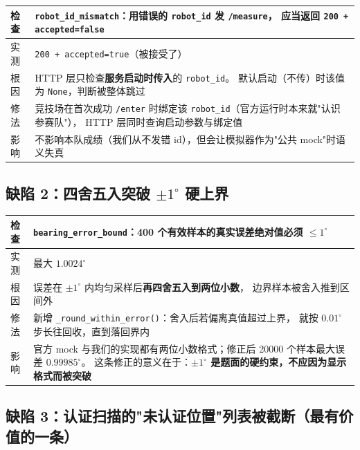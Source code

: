 \begin{center}
\begin{tabular}{p{3.2cm}p{11.6cm}}
\toprule
检查 & \texttt{robot\_id\_mismatch}：用错误的 \texttt{robot\_id} 发 \texttt{/measure}，
应当返回 \texttt{200 + accepted=false} \\ \midrule
实测 & \texttt{200 + accepted=true}（被接受了） \\
根因 & HTTP 层只检查\textbf{服务启动时传入}的 \texttt{robot\_id}。
默认启动（不传）时该值为 \texttt{None}，判断被整体跳过 \\
修法 & 竞技场在首次成功 \texttt{/enter} 时绑定该 \texttt{robot\_id}（官方运行时本来就"认识参赛队"），
HTTP 层同时查询启动参数与绑定值 \\
影响 & 不影响本队成绩（我们从不发错 id），但会让模拟器作为"公共 mock"时语义失真 \\
\bottomrule
\end{tabular}
\end{center}

\subsection{缺陷 2：四舍五入突破 $\pm1^{\circ}$ 硬上界}

\begin{center}
\begin{tabular}{p{3.2cm}p{11.6cm}}
\toprule
检查 & \texttt{bearing\_error\_bound}：400 个有效样本的真实误差绝对值必须 $\le1^{\circ}$ \\ \midrule
实测 & 最大 $1.0024^{\circ}$ \\
根因 & 误差在 $\pm1^{\circ}$ 内均匀采样后\textbf{再四舍五入到两位小数}，
边界样本被舍入推到区间外 \\
修法 & 新增 \texttt{\_round\_within\_error()}：舍入后若偏离真值超过上界，
就按 $0.01^{\circ}$ 步长往回收，直到落回界内 \\
影响 & 官方 mock 与我们的实现都有两位小数格式；修正后 20000 个样本最大误差 $0.99985^{\circ}$。
这条修正的意义在于：\textbf{$\pm1^{\circ}$ 是题面的硬约束，不应因为显示格式而被突破} \\
\bottomrule
\end{tabular}
\end{center}

\subsection{缺陷 3：认证扫描的"未认证位置"列表被截断（最有价值的一条）}

